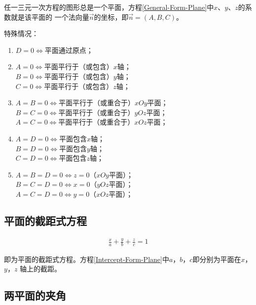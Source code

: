 \documentclass[12pt, a4paper]{article}
\numberwithin{equation}{section}
\begin{document}
    任一三元一次方程的图形总是一个平面，方程\ref{General-Form-Plane}中\(x\)、\(y\)、\(z\)的系数就是该平面的
    一个法向量\(\overrightarrow{n}\)的坐标，即\(\overrightarrow{n} = \left(A, B, C\right)\)。

    特殊情况：

    \begin{enumerate}
        \item \(D=0 \Leftrightarrow \)平面通过原点；
        \item \(A=0 \Leftrightarrow \)平面平行于（或包含）\(x\)轴；
            \\
            \(B=0 \Leftrightarrow \)平面平行于（或包含）\(y\)轴；
            \\
            \(C=0 \Leftrightarrow \)平面平行于（或包含）\(z\)轴；
        \item \(A=B=0 \Leftrightarrow \)平面平行于（或重合于）\(xOy\)平面；
            \\
            \(B=C=0 \Leftrightarrow \)平面平行于（或重合于）\(yOz\)平面；
            \\
            \(A=C=0 \Leftrightarrow \)平面平行于（或重合于）\(xOz\)平面；
        \item \(A=D=0 \Leftrightarrow \)平面包含\(x\)轴；
            \\
            \(B=D=0 \Leftrightarrow \)平面包含\(y\)轴；
            \\
            \(C=D=0 \Leftrightarrow \)平面包含\(z\)轴；
        \item \(A=B=D=0 \Leftrightarrow z=0\)（\(xOy\)平面）；
            \\
            \(B=C=D=0 \Leftrightarrow x=0\)（\(yOz\)平面）；
            \\
            \(A=C=D=0 \Leftrightarrow y=0\)（\(xOz\)平面）；
    \end{enumerate}

\subsection{平面的截距式方程}

    \begin{align}
        \frac{x}{a} + \frac{y}{b} + \frac{z}{c} = 1
        \label{Intercept-Form-Plane}
    \end{align}

    即为平面的截距式方程。方程\ref{Intercept-Form-Plane}中\(a\)，\(b\)，\(c\)即分别为平面在\(x\)，\(y\)，\(z\)
    轴上的截距。

\subsection{两平面的夹角}
\end{document}
